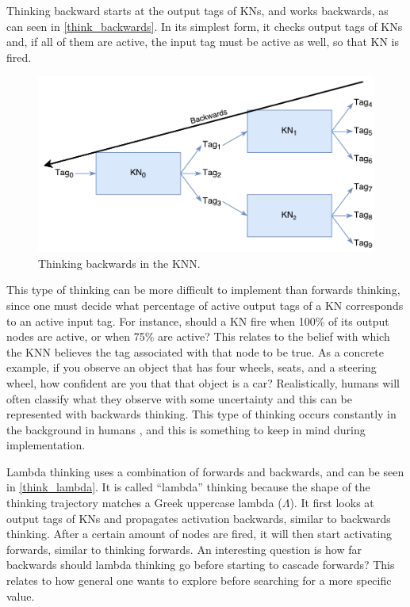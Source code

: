 \documentclass[titlepage,11pt]{article}
\begin{document}
Thinking backward starts at the output tags of KNs, and works backwards, as can seen in \autoref{think_backwards}. In its simplest form, it checks output tags of KNs and, if all of them are active, the input tag must be active as well, so that KN is fired.

\begin{figure}[!htb]
	\includegraphics[width=\columnwidth]{figures/backwards_thinking.pdf}
	\caption{Thinking backwards in the KNN.}
	\label{think_backwards}
\end{figure}

This type of thinking can be more difficult to implement than forwards thinking, since one must decide what percentage of active output tags of a KN corresponds to an active input tag. For instance, should a KN fire when 100\% of its output nodes are active, or when 75\% are active? This relates to the belief with which the KNN believes the tag associated with that node to be true. As a concrete example, if you observe an object that has four wheels, seats, and a steering wheel, how confident are you that that object is a car? Realistically, humans will often classify what they observe with some uncertainty \cite{uncertainty} and this can be represented with backwards thinking. This type of thinking occurs constantly in the background in humans \cite{vybihal-knowledge}, and this is something to keep in mind during implementation.

Lambda thinking uses a combination of forwards and backwards, and can be seen in \autoref{think_lambda}. It is called ``lambda'' thinking because the shape of the thinking trajectory matches a Greek uppercase lambda ($\Lambda$). It first looks at output tags of KNs and propagates activation backwards, similar to backwards thinking. After a certain amount of nodes are fired, it will then start activating forwards, similar to thinking forwards. An interesting question is how far backwards should lambda thinking go before starting to cascade forwards? This relates to how general one wants to explore before searching for a more specific value.
\end{document}
